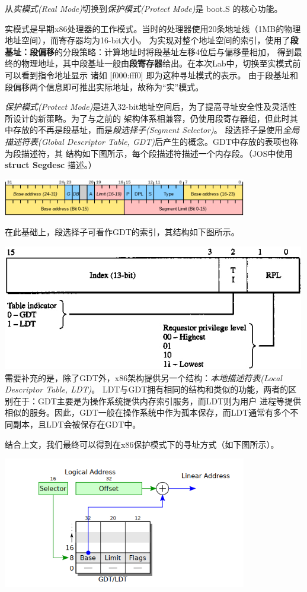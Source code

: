 \documentclass[12pt, letterpaper]{report}
\begin{document}
从\textsl{实模式(Real Mode)}切换到\textsl{保护模式(Protect Mode)}是 boot.S 的核心功能。\par 
实模式是早期x86处理器的工作模式。当时的处理器使用20条地址线（1MB的物理地址空间），而寄存器均为16-bit大小。
为实现对整个地址空间的索引，使用了\textbf{段基址：段偏移}的分段策略：计算地址时将段基址左移4位后与偏移量相加，
得到最终的物理地址，其中段基址一般由\textbf{段寄存器}给出。在本次Lab中，切换至实模式前可以看到指令地址显示
诸如 [f000:fff0] 即为这种寻址模式的表示。
由于段基址和段偏移两个信息即可推出实际地址，故称为“实”模式。\par 
\textsl{保护模式(Protect Mode)}是进入32-bit地址空间后，为了提高寻址安全性及灵活性所设计的新策略。为了与之前的
架构体系相兼容，仍使用段寄存器组，但此时其中存放的不再是段基址，而是\textsl{段选择子(Segment Selector)}。
段选择子是使用\textsl{全局描述符表(Global Descriptor Table, GDT)}后产生的概念。GDT中存放的表项也称为段描述符，其
结构如下图所示，每个段描述符描述一个内存段。（JOS中使用 \textbf{struct Segdesc} 描述。）\par
\quad \par
\includegraphics[width=0.8\textwidth]{GDTEntry}
\quad \par
\quad \par
\quad \par
在此基础上，段选择子可看作GDT的索引，其结构如下图所示。\par 
\includegraphics[width=\textwidth]{SegmentSelector}
需要补充的是，除了GDT外，x86架构提供另一个结构：\textsl{本地描述符表(Local Descriptor Table, LDT)}。
LDT与GDT拥有相同的结构和类似的功能，两者的区别在于：GDT主要是为操作系统提供内存索引服务，而LDT则为用户
进程等提供相似的服务。因此，GDT一般在操作系统中作为孤本保存，而LDT通常有多个不同副本，且LDT会被保存在GDT中。\par 
结合上文，我们最终可以得到在x86保护模式下的寻址方式（如下图所示）。\par 
\includegraphics[width=0.8\textwidth]{GDT}
\end{document}
